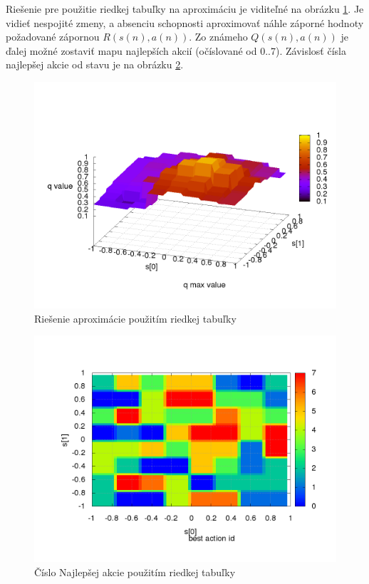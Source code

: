 \newpage
Riešenie pre použitie riedkej tabuľky na aproximáciu je viditeľné na obrázku \ref{img:experiment_sparse_table}.
Je vidieť nespojité zmeny, a absenciu schopnosti aproximovať náhle záporné hodnoty požadované zápornou
$R(s(n), a(n))$. Zo známeho $Q(s(n), a(n))$ je ďalej možné zostaviť mapu najlepších akcií (očíslované od
0..7). Závislosť čísla najlepšej akcie od stavu je na obrázku \ref{img:experiment_sparse_table_actions}.


\begin{figure}[!htb]
\centering
\includegraphics[scale=.4]{../../results_q_learning/map_2/function_type_1/iterations_10/q_learning_result.png}
\caption{Riešenie aproximácie použitím riedkej tabuľky}
\label{img:experiment_sparse_table}
\end{figure}


\begin{figure}[!htb]
\centering
\includegraphics[scale=.4]{../../results_q_learning/map_2/function_type_1/iterations_10/action_best_value_log_surface.png}
\caption{Číslo Najlepšej akcie použitím riedkej tabuľky}
\label{img:experiment_sparse_table_actions}
\end{figure}


